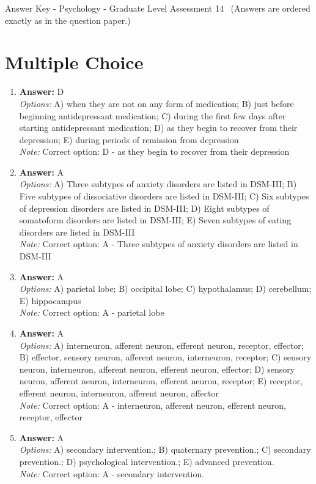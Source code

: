 \documentclass[12pt]{article}
\begin{document}
\begin{center}
Answer Key - Psychology - Graduate Level Assessment 14 \
\small (Answers are ordered exactly as in the question paper.)
\end{center}

\section*{Multiple Choice}
\begin{enumerate}[label=\arabic*.]
\item \textbf{Answer:} D
\\ \textit{Options:} A) when they are not on any form of medication; B) just before beginning antidepressant medication; C) during the first few days after starting antidepressant medication; D) as they begin to recover from their depression; E) during periods of remission from depression
\\ \textit{Note:} Correct option: D - as they begin to recover from their depression
\item \textbf{Answer:} A
\\ \textit{Options:} A) Three subtypes of anxiety disorders are listed in DSM-III; B) Five subtypes of dissociative disorders are listed in DSM-III; C) Six subtypes of depression disorders are listed in DSM-III; D) Eight subtypes of somatoform disorders are listed in DSM-III; E) Seven subtypes of eating disorders are listed in DSM-III
\\ \textit{Note:} Correct option: A - Three subtypes of anxiety disorders are listed in DSM-III
\item \textbf{Answer:} A
\\ \textit{Options:} A) parietal lobe; B) occipital lobe; C) hypothalamus; D) cerebellum; E) hippocampus
\\ \textit{Note:} Correct option: A - parietal lobe
\item \textbf{Answer:} A
\\ \textit{Options:} A) interneuron, afferent neuron, efferent neuron, receptor, effector; B) effector, sensory neuron, afferent neuron, interneuron, receptor; C) sensory neuron, interneuron, afferent neuron, efferent neuron, effector; D) sensory neuron, afferent neuron, interneuron, efferent neuron, receptor; E) receptor, efferent neuron, interneuron, afferent neuron, affector
\\ \textit{Note:} Correct option: A - interneuron, afferent neuron, efferent neuron, receptor, effector
\item \textbf{Answer:} A
\\ \textit{Options:} A) secondary intervention.; B) quaternary prevention.; C) secondary prevention.; D) psychological intervention.; E) advanced prevention.
\\ \textit{Note:} Correct option: A - secondary intervention.
\end{enumerate}
\end{document}
